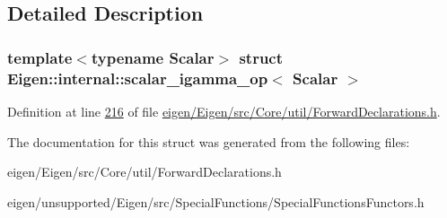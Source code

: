 \subsection{Detailed Description}
\subsubsection*{template$<$typename Scalar$>$\newline
struct Eigen\+::internal\+::scalar\+\_\+igamma\+\_\+op$<$ Scalar $>$}



Definition at line \hyperlink{eigen_2_eigen_2src_2_core_2util_2_forward_declarations_8h_source_l00216}{216} of file \hyperlink{eigen_2_eigen_2src_2_core_2util_2_forward_declarations_8h_source}{eigen/\+Eigen/src/\+Core/util/\+Forward\+Declarations.\+h}.



The documentation for this struct was generated from the following files\+:\begin{DoxyCompactItemize}
\item 
eigen/\+Eigen/src/\+Core/util/\+Forward\+Declarations.\+h\item 
eigen/unsupported/\+Eigen/src/\+Special\+Functions/\+Special\+Functions\+Functors.\+h\end{DoxyCompactItemize}
